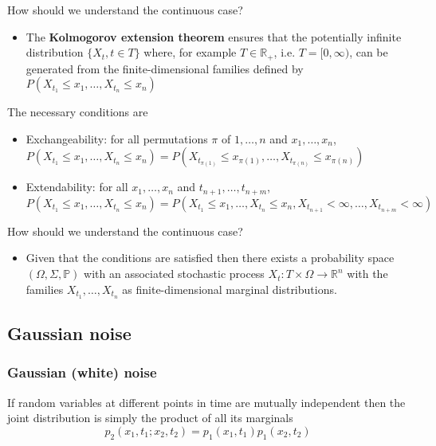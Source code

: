 \begin{frame}

How should we understand the continuous case?
\begin{itemize}
\item The \textbf{Kolmogorov extension theorem} ensures that the potentially infinite distribution $\{ X_t,t \in T \}$ where, for example $T \in \mathbb{R_+}$, i.e. $T = [0, \infty)$, can be generated from the finite-dimensional families defined by $	P(X_{t_1} \leq x_1, \ldots, X_{t_n} \leq x_n) $ \cite{Øksendal2010}
\end{itemize}
The necessary conditions are
\begin{itemize}
\item Exchangeability: for all permutations $\pi$ of $1,\ldots,n$ and $x_1,\ldots,x_n$, $P(X_{t_1} \leq x_1, \ldots, X_{t_n} \leq x_n) = P(X_{t_{\pi(1)}} \leq x_{\pi(1)}, \ldots, X_{t_{\pi(n)}} \leq x_{\pi(n)})$ 
\item Extendability: for all $x_1,\ldots,x_n$ and $t_{n+1},\ldots,t_{n+m}$, $P(X_{t_1} \leq x_1, \ldots, X_{t_n} \leq x_n) = P(X_{t_1} \leq x_1, \ldots, X_{t_n} \leq x_n, X_{t_{n+1}} < \infty, \ldots, X_{t_{n+m}} < \infty )$ 
\end{itemize}
\end{frame}

\begin{frame}
How should we understand the continuous case?
\begin{itemize}
\item Given that the conditions are satisfied then there exists a probability space $(\Omega, \Sigma, \mathbb{P})$ with an associated stochastic process $X_t : T \times \Omega \rightarrow \mathbb{R}^n$ with the families $X_{t_1}, \ldots, X_{t_n}$ as finite-dimensional marginal distributions.
\end{itemize}
\end{frame}

\subsection{Gaussian noise}

\begin{frame}
\frametitle{Gaussian (white) noise}
If random variables at different points in time are mutually independent then the joint distribution is simply the product of all its marginals
$$
p_2(x_1,t_1;x_2,t_2)=p_1(x_1,t_1)p_1(x_2,t_2)
$$
\end{frame}

